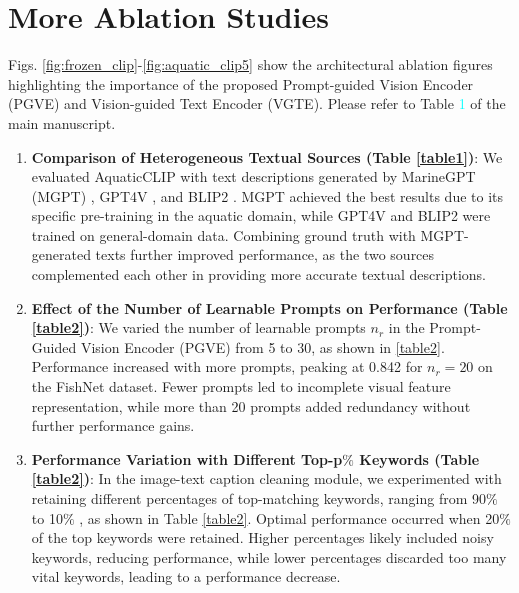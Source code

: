 \section{More Ablation Studies}
\label{ablations}
Figs. \ref{fig:frozen_clip}-\ref{fig:aquatic_clip5} show the architectural ablation figures highlighting the importance of the proposed Prompt-guided Vision Encoder (PGVE) and Vision-guided Text Encoder (VGTE).
Please refer to Table \textcolor{cyan}{1} of the main manuscript.

\begin{enumerate}
    \item \textbf{Comparison of Heterogeneous Textual Sources (Table \ref{table1})}: We evaluated AquaticCLIP with text descriptions generated by MarineGPT (MGPT) \cite{zheng2023marinegpt}, GPT4V \cite{yang2023dawn}, and BLIP2 \cite{li2023blip}.
MGPT achieved the best results due to its specific pre-training in the aquatic domain, while GPT4V and BLIP2 were trained on general-domain data. 
Combining ground truth with MGPT-generated texts further improved performance, as the two sources complemented each other in providing more accurate textual descriptions.

\item \textbf{Effect of the Number of Learnable Prompts on Performance (Table \ref{table2})}: We varied the number of learnable prompts $n_{r}$  in the Prompt-Guided Vision Encoder (PGVE) from 5 to 30, as shown in \ref{table2}. 
Performance increased with more prompts, peaking at 0.842 for $n_{r}=20$ on the FishNet dataset. 
Fewer prompts led to incomplete visual feature representation, while more than 20 prompts added redundancy without further performance gains.
\item \textbf{Performance Variation with Different Top-p$\%$ Keywords (Table \ref{table2})}: In the image-text caption cleaning module, we experimented with retaining different percentages of top-matching keywords, ranging from 90$\%$  to 10$\%$ , as shown in Table \ref{table2}. 
Optimal performance occurred when 20$\%$ of the top keywords were retained. 
Higher percentages likely included noisy keywords, reducing performance, while lower percentages discarded too many vital keywords, leading to a performance decrease.
\end{enumerate}










